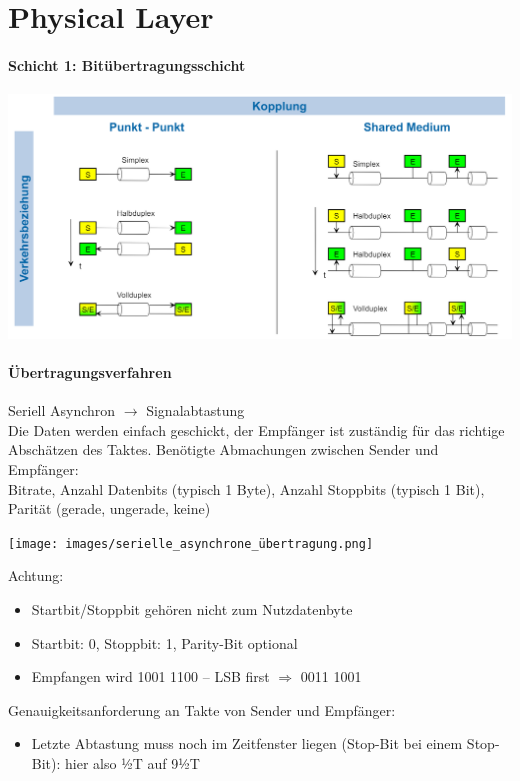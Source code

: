\section{Physical Layer}
\paragraph{Schicht 1: Bitübertragungsschicht}
\includegraphics[width=1\linewidth]{images/Verkehrsbeziehung_Kopplung.png}

\paragraph{Übertragungsverfahren}

\begin{definition}{Seriell Asynchron}  $\rightarrow$ Signalabtastung\\
    Die Daten werden einfach geschickt, der Empfänger ist zuständig für das richtige Abschätzen des Taktes.
    Benötigte Abmachungen zwischen Sender und Empfänger: \\
    Bitrate, Anzahl Datenbits (typisch 1 Byte), Anzahl Stoppbits (typisch 1 Bit), Parität (gerade, ungerade, keine)

    \texttt{[image: images/serielle\_asynchrone\_übertragung.png]}

    Achtung:
    \begin{itemize}
        \item Startbit/Stoppbit gehören nicht zum Nutzdatenbyte
        \item Startbit: 0, Stoppbit: 1, Parity-Bit optional
        \item Empfangen wird 1001 1100 – LSB first $\Rightarrow$ 0011 1001
    \end{itemize}

    Genauigkeitsanforderung an Takte von Sender und Empfänger:
    \begin{itemize}
        \item Letzte Abtastung muss noch im Zeitfenster liegen (Stop-Bit bei einem Stop-Bit): hier also ½T auf 9½T
    \end{itemize}

    
\end{definition}


